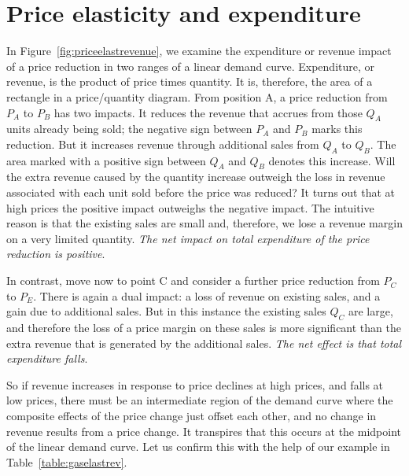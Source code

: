 \section{Price elasticity and expenditure}\label{sec:ch4sec2}

In Figure~\ref{fig:priceelastrevenue}, we examine the expenditure or revenue impact of a price reduction in two ranges of a linear demand curve. Expenditure, or revenue, is the product of price times quantity. It is, therefore, the area of a rectangle in a price/quantity diagram. From position A, a price reduction from $P_A$ to $P_B$ has two impacts. It reduces the revenue that accrues from those $Q_A$ units already being sold; the negative sign between $P_A$ and $P_B$ marks this reduction. But it increases revenue through additional sales from $Q_A$ to $Q_B$. The area marked with a positive sign between $Q_A$ and $Q_B$ denotes this increase. Will the extra revenue caused by the quantity increase outweigh the loss in revenue associated with each unit sold before the price was reduced? It turns out that at high prices the positive impact outweighs the negative impact. The intuitive reason is that the existing sales are small and, therefore, we lose a revenue margin on a very limited quantity. \textit{The net impact on total expenditure of the price reduction is positive}. 



In contrast, move now to point C and consider a further price reduction from $P_C$ to $P_E$. There is again a dual impact: a loss of revenue on existing sales, and a gain due to additional sales. But in this instance the existing sales $Q_C$ are large, and therefore the loss of a price margin on these sales is more significant than the extra revenue that is generated by the additional sales. \textit{The net effect is that total expenditure falls}.

So if revenue increases in response to price declines at high prices, and falls at low prices, there must be an intermediate region of the demand curve where the composite effects of the price change just offset each other, and no change in revenue results from a price change. It transpires that this occurs at the midpoint of the linear demand curve. Let us confirm this with the help of our example in Table~\ref{table:gaselastrev}. 


